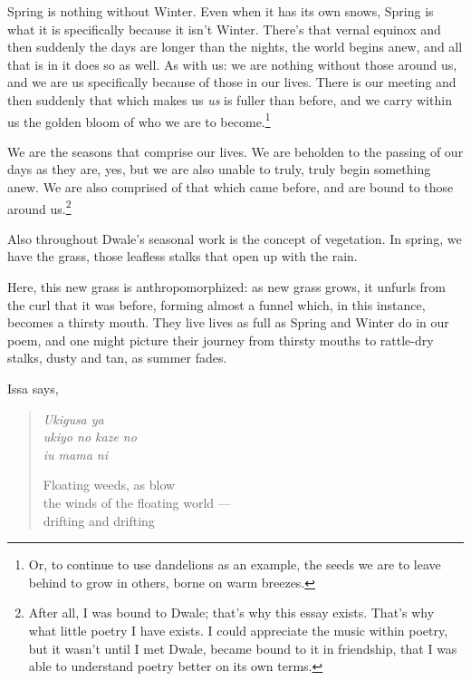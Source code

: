 Spring is nothing without Winter. Even when it has its own snows, Spring is what it is specifically because it isn't Winter. There's that vernal equinox and then suddenly the days are longer than the nights, the world begins anew, and all that is in it does so as well. As with us: we are nothing without those around us, and we are us specifically because of those in our lives. There is our meeting and then suddenly that which makes us \emph{us} is fuller than before, and we carry within us the golden bloom of who we are to become.\footnote{Or, to continue to use dandelions as an example, the seeds we are to leave behind to grow in others, borne on warm breezes.}

We are the seasons that comprise our lives. We are beholden to the passing of our days as they are, yes, but we are also unable to truly, truly begin something anew. We are also comprised of that which came before, and are bound to those around us.\footnote{After all, I was bound to Dwale; that's why this essay exists. That's why what little poetry I have exists. I could appreciate the music within poetry, but it wasn't until I met Dwale, became bound to it in friendship, that I was able to understand poetry better on its own terms.}

Also throughout Dwale's seasonal work is the concept of vegetation. In spring, we have the grass, those leafless stalks that open up with the rain.

Here, this new grass is anthropomorphized: as new grass grows, it unfurls from the curl that it was before, forming almost a funnel which, in this instance, becomes a thirsty mouth. They live lives as full as Spring and Winter do in our poem, and one might picture their journey from thirsty mouths to rattle-dry stalks, dusty and tan, as summer fades.

Issa says,

\begin{verse}
\begin{multicols}{2}
\emph{Ukigusa ya} \\
\emph{ukiyo no kaze no} \\
\emph{iu mama ni}

\columnbreak

Floating weeds, as blow \\
the winds of the floating world --- \\
drifting and drifting
\end{multicols}
\vspace{-1em}
\parencite[18]{issa}
\end{verse}

